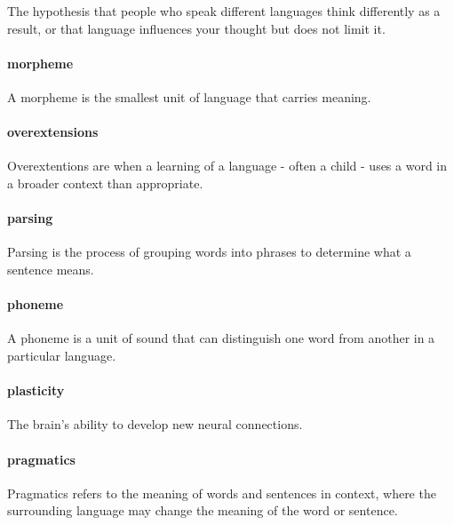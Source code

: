 \documentclass[
]{krantz}
\begin{document}
The hypothesis that people who speak different languages think differently as a result, or that language influences your thought but does not limit it.

\paragraph*{morpheme}\label{morpheme}

A morpheme is the smallest unit of language that carries meaning.

\paragraph*{overextensions}\label{overextensions}

Overextentions are when a learning of a language - often a child - uses a word in a broader context than appropriate.

\paragraph*{parsing}\label{parsing}

Parsing is the process of grouping words into phrases to determine what a sentence means.

\paragraph*{phoneme}\label{phoneme}

A phoneme is a unit of sound that can distinguish one word from another in a particular language.

\paragraph*{plasticity}\label{plasticity}

The brain's ability to develop new neural connections.

\paragraph*{pragmatics}\label{pragmatics}

Pragmatics refers to the meaning of words and sentences in context, where the surrounding language may change the meaning of the word or sentence.
\end{document}
